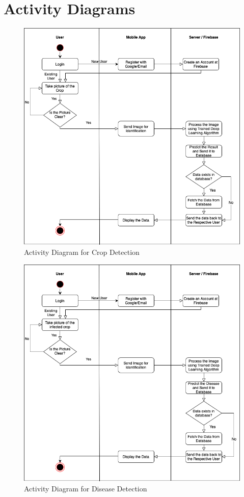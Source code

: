 \documentclass[../Report.tex]{subfiles}
\begin{document}
\section{Activity Diagrams}
\begin{figure}[H]
    \centering
    \includegraphics[width=\linewidth]{images/activity_crop.png}
    \caption{Activity Diagram for Crop Detection}
    \label{fig:activity_1}
\end{figure}

\begin{figure}[H]
    \centering
    \includegraphics[width=\linewidth]{images/activity_disease.png}
    \caption{Activity Diagram for Disease Detection}
    \label{fig:activity_2}
\end{figure}
\end{document}
